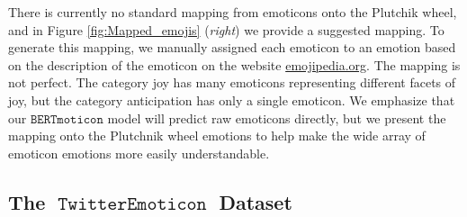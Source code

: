 \documentclass[11pt]{article}
\newcommand{\bertmoji}{\texttt{BERTmoticon}}
\DeclareMathOperator{\emoticon}{\texttt{TwitterEmoticon}}
\DeclareMathOperator{\corona}{\texttt{TwitterCOVID}}
\begin{document}
There is currently no standard mapping from emoticons onto the Plutchik wheel,
and in Figure \ref{fig:Mapped_emojis} (\emph{right}) we provide a suggested mapping.
To generate this mapping, we manually assigned each emoticon to an emotion based on the description of the emoticon on the website \url{emojipedia.org}.
The mapping is not perfect.
The category joy has many emoticons representing different facets of joy,
but the category anticipation has only a single emoticon.
We emphasize that our $\bertmoji$ model will predict raw emoticons directly,
but we present the mapping onto the Plutchnik wheel emotions to help make the wide array of emoticon emotions more easily understandable.



\subsection{The $\emoticon$ Dataset}
\end{document}
